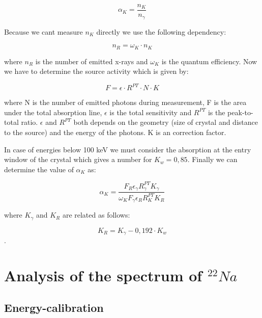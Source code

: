 \documentclass[bigchapter,colorback,accentcolor=tud4b,linedtoc,11pt]{tudreport}
\begin{document}
$$\alpha_K = \frac{n_K}{n_{\gamma}}$$

Because we cant measure $n_K$ directly we use the following dependency:

$$n_R = \omega_K \cdot n_K$$

where $n_R$ is the number of emitted x-rays and $\omega_K$ is the quantum efficiency. Now we have to determine the source activity which is given by:

$$F = \epsilon \cdot R^{PT} \cdot N \cdot K$$

where N is the number of emitted photons during measurement, F is the area under the total absorption line, $\epsilon$ is the total sensitivity and $R^{PT}$ is the peak-to-total ratio. $\epsilon$ and $R^{PT}$ both depends on the geometry (size of crystal and distance to the source) and the energy of the photons. K is an correction factor.

In case of energies below 100 keV we must consider the absorption at the entry window of the crystal which gives a number for $K_w = 0,85$. Finally we can determine the value of $\alpha_K$ as:

$$\alpha_K = \frac{F_R \epsilon_{\gamma} R_{\gamma}^{PT}  K_{\gamma}}{\omega_K F_{\gamma} \epsilon_R R_K^{PT} K_R}$$

where $K_{\gamma}$  and $K_R$ are related as follows: 

$$K_R = K_{\gamma} - 0,192 \cdot K_w$$.

\section{Analysis of the spectrum of $^{22}Na$}
\subsection{Energy-calibration}
\begin{center}
\begin{figure}[H]
\end{figure}
\end{center}
\end{document}
